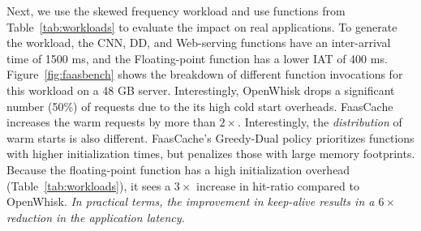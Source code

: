 Next, we use the skewed frequency workload and use functions from Table~\ref{tab:workloads} to evaluate the impact on real applications. 
To generate the workload, the CNN, DD, and Web-serving functions have an inter-arrival time of 1500 ms, and the Floating-point function has a lower IAT of 400 ms. 
%
Figure~\ref{fig:faasbench} shows the breakdown of different function invocations for this workload on a 48 GB server.
Interestingly, OpenWhisk drops a significant number (50\%) of requests due to the its high cold start overheads.
FaasCache increases the warm requests by more than $2\times$. 
Interestingly, the \emph{distribution} of warm starts is also different. 
FaasCache's Greedy-Dual policy prioritizes functions with higher initialization times, but penalizes those with large memory footprints. 
Because the floating-point function has a high initialization overhead (Table~\ref{tab:workloads}), it sees a $3\times$ increase in hit-ratio compared to OpenWhisk.
\emph{In practical terms, the improvement in keep-alive results in a $6\times$ reduction in the application latency.
}


